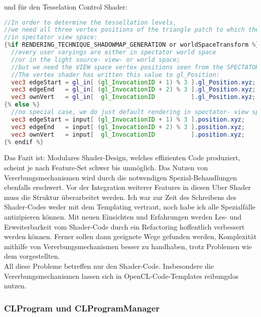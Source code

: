 	und für den Tesselation Control Shader:
	
	\begin{lstlisting}[language=GLSL]
//In order to determine the tessellation levels,
//we need all three vertex positions of the triangle patch to which the current vertex belongs,
//in spectator view space:
{%if RENDERING_TECHNIQUE_SHADOWMAP_GENERATION or worldSpaceTransform %}
  //every user varyings are either in spectator world space
  //or in the light source- view- or world space;
  //but we need the VIEW space vertex positions seen from the SPECTATOR camera for the tessellation level calculations!
  //The vertex shader has written this value to gl_Position:
  vec3 edgeStart = gl_in[ (gl_InvocationID + 1) % 3 ].gl_Position.xyz;
  vec3 edgeEnd   = gl_in[ (gl_InvocationID + 2) % 3 ].gl_Position.xyz;
  vec3 ownVert   = gl_in[  gl_InvocationID          ].gl_Position.xyz;
{% else %}
  //no special case, we do just default rendering in spectator- view space; So grab the default position value:
  vec3 edgeStart = input[ (gl_InvocationID + 1) % 3 ].position.xyz;
  vec3 edgeEnd   = input[ (gl_InvocationID + 2) % 3 ].position.xyz;
  vec3 ownVert   = input[  gl_InvocationID          ].position.xyz;  
{% endif %}  
	\end{lstlisting}
	
	
	Das Fazit ist: Modulares Shader-Design, welches effizienten Code produziert, scheint je nach Feature-Set
	schwer bis unmöglich. Das Nutzen von Vererbungsmechanismen wird durch die notwendigen Spezial-Behandlungen 
	ebenfalls erschwert.
	Vor der Integration weiterer Features in diesen Uber Shader muss die Struktur überarbeitet werden.
	Ich war zur Zeit des Schreibens des Shader-Codes weder mit dem Templating vertraut, noch habe ich alle Spezialfälle
	antizipieren können. Mit neuen Einsichten und Erfahrungen werden Les- und Erweiterbarkeit
	vom Shader-Code durch ein Refactoring hoffentlich verbessert werden können.
	Ferner sollen dann geeignete Wege gefunden werden, Komplexität mithilfe von Vererbungsmechanismen
	besser zu handhaben, trotz Problemen wie dem vorgestellten.\\
	All diese Probleme betreffen nur den Shader-Code. Insbesondere die Vererbungsmechanismen
	lassen sich in OpenCL-Code-Templates reibungslos nutzen.


		
	\subsubsection{CLProgram und CLProgramManager}
	\label{sec:CLProgram}
	
